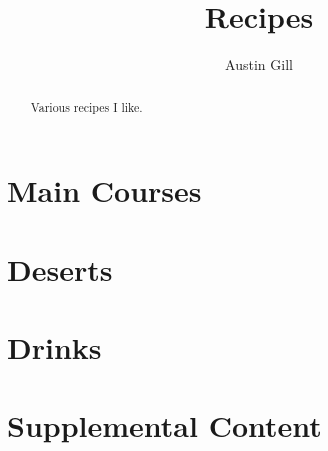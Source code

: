 \documentclass{article}
\title{Recipes}
\author{Austin Gill}
\begin{document}
    \maketitle
    \begin{abstract}
        Various recipes I like.
    \end{abstract}
    \thispagestyle{empty}

    \newpage
    \tableofcontents

    \newpage
    \section{Main Courses}\label{sec:main-courses}
        

    \section{Deserts}\label{sec:deserts}
        

    \section{Drinks}\label{sec:drinks}
        

    \newpage
    \appendix\appendixpage{}\addappheadtotoc{}
    \section{Supplemental Content}\label{sec:supplemental-content}

    \newpage
    
    
\end{document}
